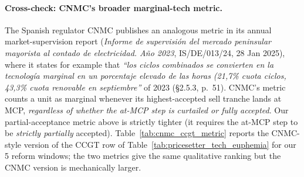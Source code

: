 \documentclass[11pt,a4paper]{article}
\begin{document}
\paragraph{Cross-check: CNMC's broader marginal-tech metric.} The Spanish regulator CNMC publishes an analogous metric in its annual market-supervision report (\emph{Informe de supervisión del mercado peninsular mayorista al contado de electricidad. A\~no 2023}, IS/DE/013/24, 28 Jan 2025), where it states for example that \emph{``los ciclos combinados se convierten en la tecnolog\'ia marginal en un porcentaje elevado de las horas (21,7\% cuota ciclos, 43,3\% cuota renovable en septiembre''} of 2023 (\S2.5.3, p.~51). CNMC's metric counts a unit as marginal whenever its highest-accepted sell tranche lands at MCP, \emph{regardless of whether the at-MCP step is curtailed or fully accepted}. Our partial-acceptance metric above is strictly tighter (it requires the at-MCP step to be \emph{strictly partially} accepted). Table~\ref{tab:cnmc_ccgt_metric} reports the CNMC-style version of the CCGT row of Table~\ref{tab:pricesetter_tech_euphemia} for our 5 reform windows; the two metrics give the same qualitative ranking but the CNMC version is mechanically larger.
\end{document}
